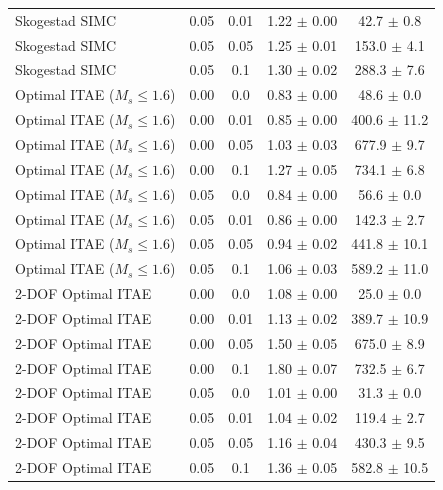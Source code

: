 \begin{table}[t]
{\begin{tabular}{lcccc}
Skogestad SIMC & 0.05 & 0.01 & 1.22 $\pm$ 0.00 & 42.7 $\pm$ 0.8 \\
Skogestad SIMC & 0.05 & 0.05 & 1.25 $\pm$ 0.01 & 153.0 $\pm$ 4.1 \\
Skogestad SIMC & 0.05 & 0.1 & 1.30 $\pm$ 0.02 & 288.3 $\pm$ 7.6 \\
Optimal ITAE ($M_s \leq 1.6$) & 0.00 & 0.0 & 0.83 $\pm$ 0.00 & 48.6 $\pm$ 0.0 \\
Optimal ITAE ($M_s \leq 1.6$) & 0.00 & 0.01 & 0.85 $\pm$ 0.00 & 400.6 $\pm$ 11.2 \\
Optimal ITAE ($M_s \leq 1.6$) & 0.00 & 0.05 & 1.03 $\pm$ 0.03 & 677.9 $\pm$ 9.7 \\
Optimal ITAE ($M_s \leq 1.6$) & 0.00 & 0.1 & 1.27 $\pm$ 0.05 & 734.1 $\pm$ 6.8 \\
Optimal ITAE ($M_s \leq 1.6$) & 0.05 & 0.0 & 0.84 $\pm$ 0.00 & 56.6 $\pm$ 0.0 \\
Optimal ITAE ($M_s \leq 1.6$) & 0.05 & 0.01 & 0.86 $\pm$ 0.00 & 142.3 $\pm$ 2.7 \\
Optimal ITAE ($M_s \leq 1.6$) & 0.05 & 0.05 & 0.94 $\pm$ 0.02 & 441.8 $\pm$ 10.1 \\
Optimal ITAE ($M_s \leq 1.6$) & 0.05 & 0.1 & 1.06 $\pm$ 0.03 & 589.2 $\pm$ 11.0 \\
2-DOF Optimal ITAE & 0.00 & 0.0 & 1.08 $\pm$ 0.00 & 25.0 $\pm$ 0.0 \\
2-DOF Optimal ITAE & 0.00 & 0.01 & 1.13 $\pm$ 0.02 & 389.7 $\pm$ 10.9 \\
2-DOF Optimal ITAE & 0.00 & 0.05 & 1.50 $\pm$ 0.05 & 675.0 $\pm$ 8.9 \\
2-DOF Optimal ITAE & 0.00 & 0.1 & 1.80 $\pm$ 0.07 & 732.5 $\pm$ 6.7 \\
2-DOF Optimal ITAE & 0.05 & 0.0 & 1.01 $\pm$ 0.00 & 31.3 $\pm$ 0.0 \\
2-DOF Optimal ITAE & 0.05 & 0.01 & 1.04 $\pm$ 0.02 & 119.4 $\pm$ 2.7 \\
2-DOF Optimal ITAE & 0.05 & 0.05 & 1.16 $\pm$ 0.04 & 430.3 $\pm$ 9.5 \\
2-DOF Optimal ITAE & 0.05 & 0.1 & 1.36 $\pm$ 0.05 & 582.8 $\pm$ 10.5 \\
\bottomrule
\end{tabular}%
}
\end{table}
